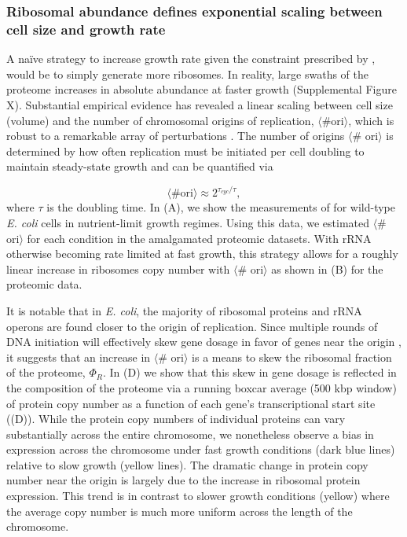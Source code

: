 \subsubsection{Ribosomal abundance defines exponential scaling between cell size
and growth rate}
A na\"ive strategy to increase growth rate given the constraint
prescribed by , would be to simply generate more ribosomes. In
reality, large swaths of the proteome increases in absolute abundance at faster growth
(Supplemental Figure X). Substantial empirical evidence has revealed
a linear scaling between cell size (volume) and the number of chromosomal
origins of replication, $\langle\text{\# ori}\rangle$, which is robust to a
remarkable array of perturbations \citep{si2017}. The number of origins
$\langle$\# ori$\rangle$ is determined by how often replication must be
initiated per cell doubling to maintain steady-state growth and can be
quantified via 

\begin{equation}
    \langle \text{\# ori} \rangle \approx 2^{\tau_{cyc} / \tau},
\end{equation}
where $\tau$ is the doubling time. In (A), we
show the measurements of \cite{si2017} for wild-type \textit{E. coli} cells
in nutrient-limit growth regimes. Using this data, we estimated $\langle$\#
ori$\rangle$ for each condition in the amalgamated proteomic datasets. With
rRNA otherwise becoming rate limited at fast growth, this strategy allows for
a roughly linear increase in ribosomes copy number with $\langle$\#
ori$\rangle$ as shown in (B) for the proteomic
data.

It is notable that in \textit{E. coli}, the majority of ribosomal proteins and rRNA operons are found
closer to the origin of replication. Since multiple rounds of DNA initiation will effectively
skew gene dosage in favor of genes near the origin \citep{scholz2019}, it suggests
that an increase in  $\langle$\# ori$\rangle$ is a means to skew the ribosomal
fraction of the proteome, $\Phi_R$. In (D) we show
that this skew in gene dosage is reflected in the composition of the proteome
via a running boxcar average (500 kbp window) of protein copy number as a function
of each gene's transcriptional start site ((D)).
While the protein copy numbers of individual proteins can vary substantially
across the entire chromosome, we nonetheless observe a bias in expression across
the chromosome under fast growth conditions (dark blue lines) relative to slow
growth (yellow lines). The dramatic
change in protein copy number near the origin is largely due to the increase
in ribosomal protein expression. This trend is in contrast to slower growth
conditions (yellow) where the average copy number is much more uniform across
the length of the chromosome.


